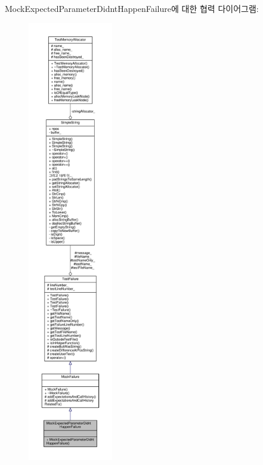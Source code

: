Mock\+Expected\+Parameter\+Didnt\+Happen\+Failure에 대한 협력 다이어그램\+:
\nopagebreak
\begin{figure}[H]
\begin{center}
\leavevmode
\includegraphics[height=550pt]{class_mock_expected_parameter_didnt_happen_failure__coll__graph}
\end{center}
\end{figure}
